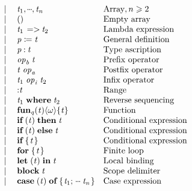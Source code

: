 \begin{figure}
$$\begin{array}{lrcll}
&      & \vb & \ensuremath{\Varid{t}_{\mathrm{1}},\mydots,\Varid{t}_{\Varid{n}}}  & \text{Array}, n \geq 2 \\
&      & \vb & \ensuremath{()}              & \text{Empty array} \\
&      & \vb & \ensuremath{\Varid{t}_{\mathrm{1}}\;\!=>\!\!\;\Varid{t}_{\mathrm{2}}}    & \text{Lambda expression} \\
&      & \vb & \ensuremath{\Varid{p}\mathrel{\coloneqq}\Varid{t}}          & \text{General definition} \\
&      & \vb & \ensuremath{\Varid{p}\mathbin{:}\Varid{t}}           & \text{Type ascription} \\
&      & \vb & \ensuremath{\Varid{op}_{\Varid{b}}\;\Varid{t}}          & \text{Prefix operator} \\
&      & \vb & \ensuremath{\Varid{t}\;\Varid{op}_{\Varid{a}}}          & \text{Postfix operator} \\
&      & \vb & \ensuremath{\Varid{t}_{\mathrm{1}}\;\Varid{op}_{\Varid{i}}\;\Varid{t}_{\mathrm{2}}}    & \text{Infix operator} \\
&      & \vb & \ensuremath{\mathbin{:}\Varid{t}}             & \text{Range} \\
&      & \vb & \ensuremath{\Varid{t}_{\mathrm{1}}\;\mathbf{where}\;\Varid{t}_{\mathrm{2}}}   & \text{Reverse sequencing} \\
&      & \vb & \ensuremath{\textbf{fun}_{\Varid{q}}(\Varid{t})\langle\omega\rangle\{\Varid{t}\}}    & \text{Function} \\
&      & \vb & \ensuremath{\textbf{if}\;(\Varid{t})\;\textbf{then}\;\Varid{t}}    & \text{Conditional expression} \\
&      & \vb & \ensuremath{\textbf{if}\;(\Varid{t})\;\textbf{else}\;\Varid{t}}    & \text{Conditional expression} \\
&      & \vb & \ensuremath{\textbf{if}\;\{\mskip1.5mu \Varid{t}\mskip1.5mu\}}           & \text{Conditional expression} \\
&      & \vb & \ensuremath{\textbf{for}\;\{\mskip1.5mu \Varid{t}\mskip1.5mu\}}          & \text{Finite loop} \\
&      & \vb & \ensuremath{\mathbf{let}\;(\Varid{t})\;\textbf{in}\;\Varid{t}}     & \text{Local binding} \\
&      & \vb & \ensuremath{\textbf{block}\;\Varid{t}}         & \text{Scope delimiter} \\
&      & \vb & \ensuremath{\textbf{case}\;(\Varid{t})\;\textbf{of}\;\{\mskip1.5mu \Varid{t}_{\mathrm{1}};\,\mydots\;\Varid{t}_{\Varid{n}}\mskip1.5mu\}}    & \text{Case expression} \\

\end{array}$$
\end{figure}
